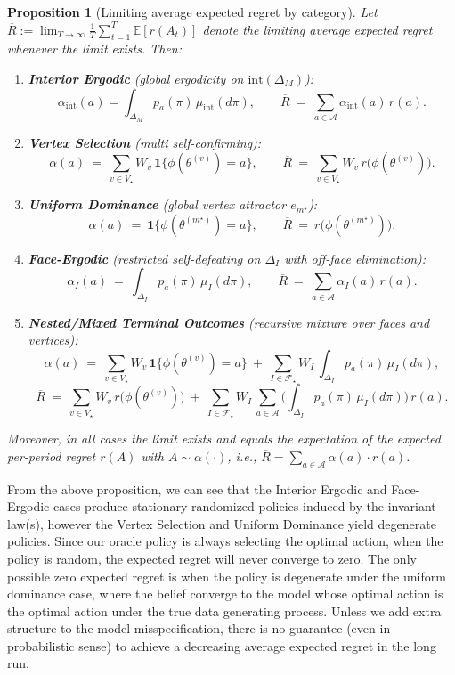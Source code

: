 \documentclass[12pt]{article}
\newtheorem{proposition}{Proposition}
\begin{document}
\begin{proposition}[Limiting average expected regret by category]\label{prop:MM_limiting_regret}
Let $\overline R:=\lim_{T\to\infty} \frac{1}{T}\sum_{t=1}^T \mathbb{E}[r(A_t)]$ denote the limiting average expected regret whenever the limit exists. Then:
\begin{enumerate}
\item \textbf{Interior Ergodic} (global ergodicity on $\mathrm{int}(\Delta_M)$): 
\[
\alpha_{\mathrm{int}}(a)=\int_{\Delta_M} p_a(\pi)\,\mu_{\mathrm{int}}(d\pi),\qquad 
\overline R\ =\ \sum_{a\in\mathcal A}\alpha_{\mathrm{int}}(a)\,r(a).
\]
\item \textbf{Vertex Selection} (multi self-confirming): 
\[
\alpha(a)\ =\ \sum_{v\in V_\star} W_v\,\mathbf{1}\{\phi(\theta^{(v)})=a\},\qquad 
\overline R\ =\ \sum_{v\in V_\star} W_v\, r\!\big(\phi(\theta^{(v)})\big).
\]
\item \textbf{Uniform Dominance} (global vertex attractor $e_{m^\star}$): 
\[
\alpha(a)\ =\ \mathbf{1}\{\phi(\theta^{(m^\star)})=a\},\qquad 
\overline R\ =\ r\!\big(\phi(\theta^{(m^\star)})\big).
\]
\item \textbf{Face-Ergodic} (restricted self-defeating on $\Delta_I$ with off-face elimination): 
\[
\alpha_I(a)\ =\ \int_{\Delta_I} p_a(\pi)\,\mu_I(d\pi),\qquad 
\overline R\ =\ \sum_{a\in\mathcal A}\alpha_I(a)\,r(a).
\]
\item \textbf{Nested/Mixed Terminal Outcomes} (recursive mixture over faces and vertices):
\[
\alpha(a)\ =\ \sum_{v\in V_\star} W_v\,\mathbf{1}\{\phi(\theta^{(v)})=a\}
\ +\ \sum_{I\in\mathcal F_\star} W_I\,\int_{\Delta_I} p_a(\pi)\,\mu_I(d\pi),
\]
\[ 
\overline R\ =\ \sum_{v\in V_\star} W_v\, r\!\big(\phi(\theta^{(v)})\big)
\ +\ \sum_{I\in\mathcal F_\star} W_I\,\sum_{a\in\mathcal A}\Big(\int_{\Delta_I} p_a(\pi)\,\mu_I(d\pi)\Big)\,r(a).
\]
\end{enumerate}
Moreover, in all cases the limit exists and equals the expectation of the expected per-period regret $r(A)$ with $A\sim \alpha(\cdot)$, i.e., $\overline R = \sum_{a\in\mathcal A} \alpha(a) \cdot r(a)$.
\end{proposition}


From the above proposition, we can see that the Interior Ergodic and Face-Ergodic cases produce stationary randomized policies induced by the invariant law(s), however the Vertex Selection and Uniform Dominance yield degenerate policies. Since our oracle policy is always selecting the optimal action, when the policy is random, the expected regret will never converge to zero. The only possible zero expected regret is when the policy is degenerate under the uniform dominance case, where the belief converge to the model whose optimal action is the optimal action under the true data generating process. Unless we add extra structure to the model misspecification, there is no guarantee (even in probabilistic sense) to achieve a decreasing average expected regret in the long run.
\end{document}
